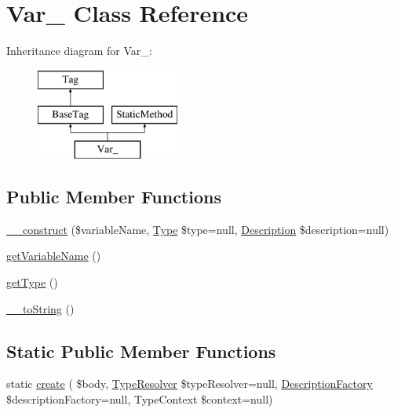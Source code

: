 \hypertarget{classphp_documentor_1_1_reflection_1_1_doc_block_1_1_tags_1_1_var__}{}\section{Var\+\_\+ Class Reference}
\label{classphp_documentor_1_1_reflection_1_1_doc_block_1_1_tags_1_1_var__}
Inheritance diagram for Var\+\_\+\+:\begin{figure}[H]
\begin{center}
\leavevmode
\includegraphics[height=3.000000cm]{classphp_documentor_1_1_reflection_1_1_doc_block_1_1_tags_1_1_var__}
\end{center}
\end{figure}
\subsection*{Public Member Functions}
\begin{DoxyCompactItemize}
\item 
\mbox{\hyperlink{classphp_documentor_1_1_reflection_1_1_doc_block_1_1_tags_1_1_var___a1e5de5b31a43e9ffe064e27942aa5e63}{\+\_\+\+\_\+construct}} (\$variable\+Name, \mbox{\hyperlink{interfacephp_documentor_1_1_reflection_1_1_type}{Type}} \$type=null, \mbox{\hyperlink{classphp_documentor_1_1_reflection_1_1_doc_block_1_1_description}{Description}} \$description=null)
\item 
\mbox{\hyperlink{classphp_documentor_1_1_reflection_1_1_doc_block_1_1_tags_1_1_var___a20af85a4f4041ed681b095e1427b2a1d}{get\+Variable\+Name}} ()
\item 
\mbox{\hyperlink{classphp_documentor_1_1_reflection_1_1_doc_block_1_1_tags_1_1_var___a830b5c75df72b32396701bc563fbe3c7}{get\+Type}} ()
\item 
\mbox{\hyperlink{classphp_documentor_1_1_reflection_1_1_doc_block_1_1_tags_1_1_var___a7516ca30af0db3cdbf9a7739b48ce91d}{\+\_\+\+\_\+to\+String}} ()
\end{DoxyCompactItemize}
\subsection*{Static Public Member Functions}
\begin{DoxyCompactItemize}
\item 
static \mbox{\hyperlink{classphp_documentor_1_1_reflection_1_1_doc_block_1_1_tags_1_1_var___a01b1e5c3741d05766720d8cb6d900172}{create}} ( \$body, \mbox{\hyperlink{classphp_documentor_1_1_reflection_1_1_type_resolver}{Type\+Resolver}} \$type\+Resolver=null, \mbox{\hyperlink{classphp_documentor_1_1_reflection_1_1_doc_block_1_1_description_factory}{Description\+Factory}} \$description\+Factory=null, Type\+Context \$context=null)
\end{DoxyCompactItemize}
